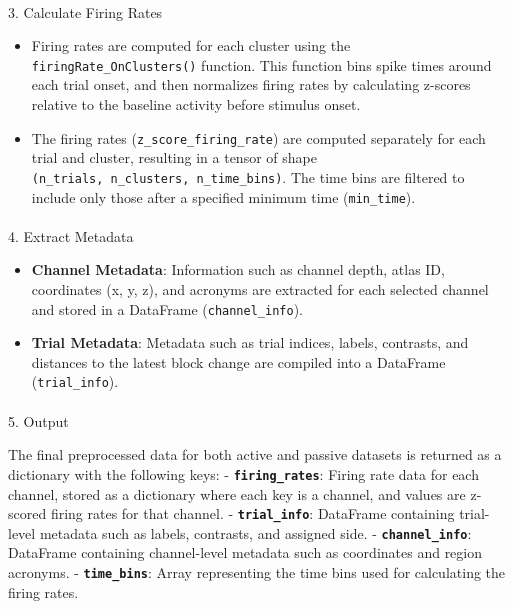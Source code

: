 \documentclass[
  letterpaper,
  DIV=11,
  numbers=noendperiod]{scrartcl}
\makeatletter
\let\oldparagraph\paragraph
\renewcommand{\paragraph}{
    \@ifstar
      \xxxParagraphStar
      \xxxParagraphNoStar
  }
\newcommand{\xxxParagraphStar}[1]{\oldparagraph*{#1}\mbox{}}
\newcommand{\xxxParagraphNoStar}[1]{\oldparagraph{#1}\mbox{}}
\providecommand{\tightlist}{%
  \setlength{\itemsep}{0pt}\setlength{\parskip}{0pt}}\usepackage{longtable,booktabs,array}
\makeatother
\begin{document}
\paragraph{3. Calculate Firing Rates}\label{calculate-firing-rates}

\begin{itemize}
\tightlist
\item
  Firing rates are computed for each cluster using the
  \texttt{firingRate\_OnClusters()} function. This function bins spike
  times around each trial onset, and then normalizes firing rates by
  calculating z-scores relative to the baseline activity before stimulus
  onset.
\item
  The firing rates (\texttt{z\_score\_firing\_rate}) are computed
  separately for each trial and cluster, resulting in a tensor of shape
  \texttt{(n\_trials,\ n\_clusters,\ n\_time\_bins)}. The time bins are
  filtered to include only those after a specified minimum time
  (\texttt{min\_time}).
\end{itemize}

\paragraph{4. Extract Metadata}\label{extract-metadata}

\begin{itemize}
\tightlist
\item
  \textbf{Channel Metadata}: Information such as channel depth, atlas
  ID, coordinates (x, y, z), and acronyms are extracted for each
  selected channel and stored in a DataFrame (\texttt{channel\_info}).
\item
  \textbf{Trial Metadata}: Metadata such as trial indices, labels,
  contrasts, and distances to the latest block change are compiled into
  a DataFrame (\texttt{trial\_info}).
\end{itemize}

\paragraph{5. Output}\label{output}

The final preprocessed data for both active and passive datasets is
returned as a dictionary with the following keys: -
\textbf{\texttt{firing\_rates}}: Firing rate data for each channel,
stored as a dictionary where each key is a channel, and values are
z-scored firing rates for that channel. - \textbf{\texttt{trial\_info}}:
DataFrame containing trial-level metadata such as labels, contrasts, and
assigned side. - \textbf{\texttt{channel\_info}}: DataFrame containing
channel-level metadata such as coordinates and region acronyms. -
\textbf{\texttt{time\_bins}}: Array representing the time bins used for
calculating the firing rates.
\end{document}
